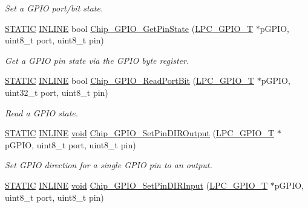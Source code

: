 \begin{DoxyCompactItemize}
\begin{DoxyCompactList}\small\item\em Set a G\-P\-I\-O port/bit state. \end{DoxyCompactList}\item 
\hyperlink{group__LPC__Types__Public__Macros_ga10b2d890d871e1489bb02b7e70d9bdfb}{S\-T\-A\-T\-I\-C} \hyperlink{group__LPC__Types__Public__Types_ga2eb6f9e0395b47b8d5e3eeae4fe0c116}{I\-N\-L\-I\-N\-E} bool \hyperlink{group__GPIO__17XX__40XX_ga9f0e35190f01c706564a88f1f88cf716}{Chip\-\_\-\-G\-P\-I\-O\-\_\-\-Get\-Pin\-State} (\hyperlink{structLPC__GPIO__T}{L\-P\-C\-\_\-\-G\-P\-I\-O\-\_\-\-T} $\ast$p\-G\-P\-I\-O, uint8\-\_\-t port, uint8\-\_\-t pin)
\begin{DoxyCompactList}\small\item\em Get a G\-P\-I\-O pin state via the G\-P\-I\-O byte register. \end{DoxyCompactList}\item 
\hyperlink{group__LPC__Types__Public__Macros_ga10b2d890d871e1489bb02b7e70d9bdfb}{S\-T\-A\-T\-I\-C} \hyperlink{group__LPC__Types__Public__Types_ga2eb6f9e0395b47b8d5e3eeae4fe0c116}{I\-N\-L\-I\-N\-E} bool \hyperlink{group__GPIO__17XX__40XX_ga74ca55b747c3a51c1ae3e47645da0c75}{Chip\-\_\-\-G\-P\-I\-O\-\_\-\-Read\-Port\-Bit} (\hyperlink{structLPC__GPIO__T}{L\-P\-C\-\_\-\-G\-P\-I\-O\-\_\-\-T} $\ast$p\-G\-P\-I\-O, uint32\-\_\-t port, uint8\-\_\-t pin)
\begin{DoxyCompactList}\small\item\em Read a G\-P\-I\-O state. \end{DoxyCompactList}\item 
\hyperlink{group__LPC__Types__Public__Macros_ga10b2d890d871e1489bb02b7e70d9bdfb}{S\-T\-A\-T\-I\-C} \hyperlink{group__LPC__Types__Public__Types_ga2eb6f9e0395b47b8d5e3eeae4fe0c116}{I\-N\-L\-I\-N\-E} \hyperlink{Paradigm_2Tern__EE_2small_2portmacro_8h_a14d32f8130d3c0b212cfc751730b5b49}{void} \hyperlink{group__GPIO__17XX__40XX_gadd0450341df62f7e13ee57cd249fe2a2}{Chip\-\_\-\-G\-P\-I\-O\-\_\-\-Set\-Pin\-D\-I\-R\-Output} (\hyperlink{structLPC__GPIO__T}{L\-P\-C\-\_\-\-G\-P\-I\-O\-\_\-\-T} $\ast$p\-G\-P\-I\-O, uint8\-\_\-t port, uint8\-\_\-t pin)
\begin{DoxyCompactList}\small\item\em Set G\-P\-I\-O direction for a single G\-P\-I\-O pin to an output. \end{DoxyCompactList}\item 
\hyperlink{group__LPC__Types__Public__Macros_ga10b2d890d871e1489bb02b7e70d9bdfb}{S\-T\-A\-T\-I\-C} \hyperlink{group__LPC__Types__Public__Types_ga2eb6f9e0395b47b8d5e3eeae4fe0c116}{I\-N\-L\-I\-N\-E} \hyperlink{Paradigm_2Tern__EE_2small_2portmacro_8h_a14d32f8130d3c0b212cfc751730b5b49}{void} \hyperlink{group__GPIO__17XX__40XX_ga0c20af0c6b9cee61714643bef6614485}{Chip\-\_\-\-G\-P\-I\-O\-\_\-\-Set\-Pin\-D\-I\-R\-Input} (\hyperlink{structLPC__GPIO__T}{L\-P\-C\-\_\-\-G\-P\-I\-O\-\_\-\-T} $\ast$p\-G\-P\-I\-O, uint8\-\_\-t port, uint8\-\_\-t pin)

\end{DoxyCompactItemize}
